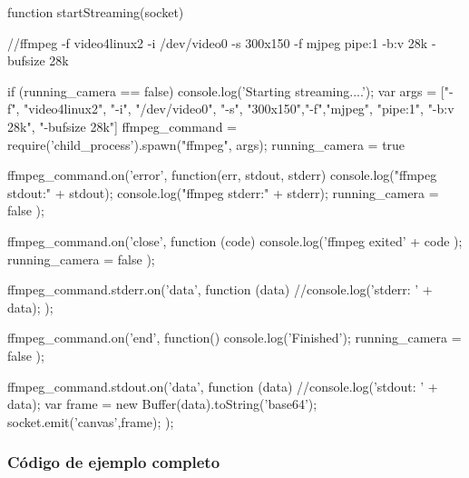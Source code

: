 function startStreaming(socket) {
  //ffmpeg -f video4linux2 -i /dev/video0 -s 300x150 -f mjpeg pipe:1 -b:v 28k -bufsize 28k

  if (running_camera == false){
    console.log('Starting streaming....');
    var args = ["-f", "video4linux2", "-i", "/dev/video0", "-s", "300x150","-f","mjpeg", "pipe:1", "-b:v 28k", "-bufsize 28k"]
    ffmpeg_command = require('child_process').spawn("ffmpeg", args);
    running_camera = true
  }

  ffmpeg_command.on('error', function(err, stdout, stderr) {
    console.log("ffmpeg stdout:\n" + stdout);
    console.log("ffmpeg stderr:\n" + stderr);
    running_camera = false
  });


  ffmpeg_command.on('close', function (code) {
    console.log('ffmpeg exited' + code );
    running_camera = false
  });


  ffmpeg_command.stderr.on('data', function (data) {
    //console.log('stderr: ' + data);
  });

  ffmpeg_command.on('end', function() {
    console.log('Finished');
    running_camera = false
  });

  ffmpeg_command.stdout.on('data', function (data) {
    //console.log('stdout: ' + data);
    var frame = new Buffer(data).toString('base64');
    socket.emit('canvas',frame);
  });

}





\subsubsection{Código de ejemplo completo}

